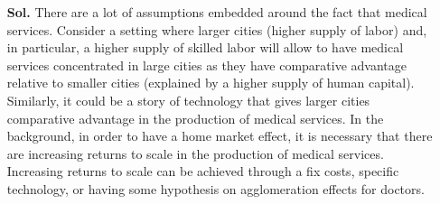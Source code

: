 \documentclass[12pt,oneside,reqno]{amsart}
\begin{document}
\begin{enumerate}[label=\textbf{\roman*.}]
    \item[\textbf{Sol.}] There are a lot of assumptions embedded around the fact that medical services. Consider a setting where larger cities (higher supply of labor) and, in particular, a higher supply of skilled labor will allow to have medical services concentrated in large cities as they have comparative advantage relative to smaller cities (explained by a higher supply of human capital). Similarly, it could be a story of technology that gives larger cities comparative advantage in the production of medical services. In the background, in order to have a home market effect, it is necessary that there are increasing returns to scale in the production of medical services. Increasing returns to scale can be achieved through a fix costs, specific technology, or having some hypothesis on agglomeration effects for doctors. 
    \end{enumerate}
\end{document}
